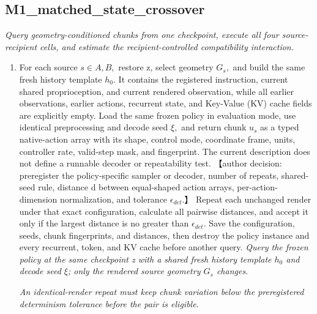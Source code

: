 \documentclass[10pt,a4paper]{article}
\begin{document}
\subsection*{M1\_matched\_state\_crossover}
\emph{Query geometry-conditioned chunks from one checkpoint, execute all four source-recipient cells, and estimate the recipient-controlled compatibility interaction.}
\begin{enumerate}[leftmargin=*,start=4]
  \item For each source \(s\in {A,B},\) restore z, select geometry \(G_{s},\) and build the same fresh history template \(h_{0}.\) It contains the registered instruction, current shared proprioception, and current rendered observation, while all earlier observations, earlier actions, recurrent state, and Key-Value (KV) cache fields are explicitly empty. Load the same frozen policy in evaluation mode, use identical preprocessing and decode seed \(\xi ,\) and return chunk \(u_{s}\) as a typed native-action array with its shape, control mode, coordinate frame, units, controller rate, valid-step mask, and fingerprint. The current description does not define a runnable decoder or repeatability test. 【author decision: preregister the policy-specific sampler or decoder, number of repeats, shared-seed rule, distance d between equal-shaped action arrays, per-action-dimension normalization, and tolerance \(\epsilon _{det}.\)】 Repeat each unchanged render under that exact configuration, calculate all pairwise distances, and accept it only if the largest distance is no greater than \(\epsilon _{det}.\) Save the configuration, seeds, chunk fingerprints, and distances, then destroy the policy instance and every recurrent, token, and KV cache before another query.
\noindent\emph{Query the frozen policy at the same checkpoint z with a shared fresh history template \(h_{0}\) and decode seed \(\xi \);\allowbreak{} only the rendered source geometry \(G_{s}\) changes.}
\par{}
\noindent\emph{An identical-render repeat must keep chunk variation below the preregistered determinism tolerance before the pair is eligible.}
\par{}

\end{enumerate}
\end{document}
